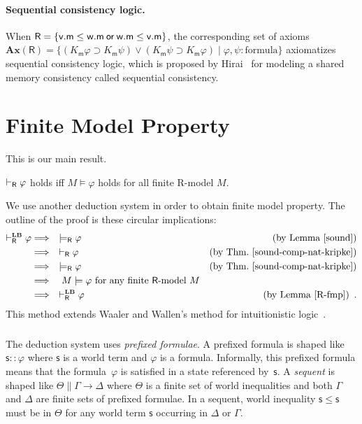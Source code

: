     \paragraph{Sequential consistency logic.}
    When $\mathsf R=\{\mathsf v.\mathsf m\le\mathsf w.\mathsf m\mathbin{\mathsf{or}} \mathsf
    w.\mathsf m\le \mathsf v.\mathsf m\}$,
    the corresponding set of axioms
    $\mathbf{Ax}(\mathsf R) = \{(K_{\mathsf m}\varphi\supset K_{\mathsf
    m}\psi)\vee(K_{\mathsf m}\psi\supset K_{\mathsf m}\varphi)\mid \varphi,
    \psi\colon\mbox{formula}\}$
    axiomatizes sequential consistency logic,
    which is proposed by Hirai~\cite{hirailpar} for modeling a shared memory consistency called sequential consistency.


  \section{Finite Model Property}
  \label{fmp-proof}

  This is our main result.
  \begin{theorem}
   \label{thm:fmp}
   $\vdash_{\mathsf R}\varphi$ holds iff $M\models \varphi$ holds
   for all finite {\sf R}-model $M$.
  \end{theorem}

  We use another deduction system\,\LB\,in order to obtain finite model
  property.
  The outline of the proof is these circular implications:
  \begin{align*}
   \vdashRLB\varphi &\Longrightarrow \quad \models_{\mathsf R}\varphi\quad
   &(\mbox{by Lemma~\ref{sound}})\\
   &\Longrightarrow \quad \vdash_{\mathsf R}\varphi &(\mbox{by
   Thm.~\ref{sound-comp-nat-kripke}}) \\
   &\Longrightarrow\quad \modelsR\varphi &\mbox{(by Thm.~\ref{sound-comp-nat-kripke})}\\
   &\Longrightarrow\quad M\models\varphi \mbox{ for any finite $\mathsf
   R$-model }M\\
   &\Longrightarrow\quad \vdashRLB\varphi & (\mbox{by
   Lemma~\ref{R-fmp}})\enspace .
  \end{align*}
  This method extends Waaler
  and Wallen's method for intuitionistic logic~\cite{waaler1999tableaux}.

   \subsubsection{\LB}

   The deduction system\,\LB\,uses \textit{prefixed formulae}.  A
   prefixed formula is shaped like $\mathsf s::\varphi$ where $\mathsf s $
   is a world term and $\varphi$ is a formula.
   Informally, this prefixed formula means that the formula~$\varphi$ is
   satisfied in a state referenced by~$\mathsf s$.
   A \textit{sequent} is shaped like
   $\Theta\parallel \Gamma\longrightarrow \Delta$ where
   $\Theta$ is a finite set of world inequalities and both
   $\Gamma$ and $\Delta$ are finite sets of prefixed formulae.
   In a sequent, world inequality
   $\mathsf s\le \mathsf s$ must be in $\Theta$
   for any world term $\mathsf s$ occurring in $\Delta$ or $\Gamma$.

